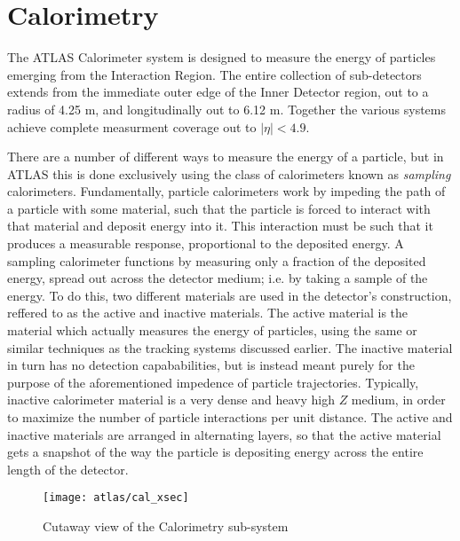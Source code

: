 \section{Calorimetry} \label{sec:calorimeter}
    The ATLAS Calorimeter system is designed to measure the energy of particles emerging from the Interaction Region.
    The entire collection of sub-detectors extends from the immediate outer edge of the Inner Detector region, out to a radius of 4.25 m, and longitudinally out to 6.12 m.
    Together the various systems achieve complete measurment coverage out to $|\eta| < 4.9$.

    There are a number of different ways to measure the energy of a particle, but in ATLAS this is done exclusively using the class of calorimeters known as \textit{sampling} calorimeters.
    Fundamentally, particle calorimeters work by impeding the path of a particle with some material, such that the particle is forced to interact with that material and deposit energy into it.
    This interaction must be such that it produces a measurable response, proportional to the deposited energy.
    A sampling calorimeter functions by measuring only a fraction of the deposited energy, spread out across the detector medium; i.e. by taking a sample of the energy.
    To do this, two different materials are used in the detector's construction, reffered to as the active and inactive materials.
    The active material is the material which actually measures the energy of particles, using the same or similar techniques as the tracking systems discussed earlier.
    The inactive material in turn has no detection capababilities, but is instead meant purely for the purpose of the aforementioned impedence of particle trajectories.
    Typically, inactive calorimeter material is a very dense and heavy high $Z$ medium, in order to maximize the number of particle interactions per unit distance.
    The active and inactive materials are arranged in alternating layers, so that the active material gets a snapshot of the way the particle is depositing energy across the entire length of the detector.\cite{energy_measurement}

    \begin{figure}
        \texttt{[image: atlas/cal\_xsec]}
        \caption{Cutaway view of the Calorimetry sub-system \cite{atlas_tdr}}
        \label{fig:cal_xsec}
    \end{figure}

